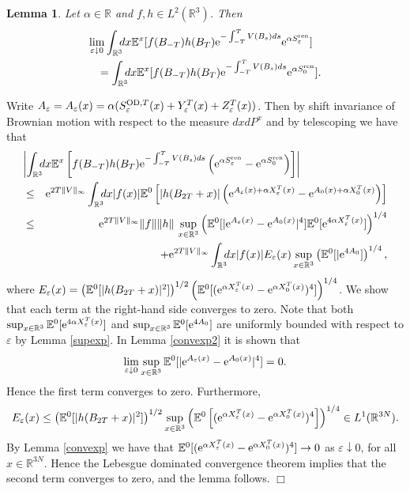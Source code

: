 \documentclass[11pt]{article}
\newtheorem{lemma}[theorem]{Lemma}
\providecommand{\idx}{\int_{\BR} \!\!\! dx}
\newcommand{\Ebb}{{\mathbb E}}
\providecommand{\qed}{\hfill {$\Box$}\par\medskip}
\providecommand{\BR}{{\mathbb{R}^3 }}
\providecommand{\od}{{\rm OD}}
\providecommand{\RR}{\mathbb{R}}
\providecommand{\LR}{{L^2(\BR)}}
\providecommand{\lk}{\left(}
\providecommand{\rk}{\right)}
\providecommand{\han}{{1/2}}
\providecommand{\non}{\nonumber}
\providecommand{\e}{{\rm e}}
\providecommand{\1}{\mathbb{1}}
\providecommand{\eps}{\varepsilon}
\providecommand{\ren}{{\rm ren}}
\begin{document}
\begin{lemma}
\label{54321}
Let $\alpha\in\RR$ and  $f,h\in\LR$. Then
\begin{eqnarray}
\lefteqn{
\lim_{\eps\downarrow 0}\idx  \Ebb^x [f(B_{-T}) h(B_T)  \e^{-\int_{-T}^TV(B_s)ds}
\e^{\alpha S_\eps^\ren }]\non} \\
&&\label{hanatarasi}
= \idx  \Ebb^x [f(B_{-T} )h(B_T)\e^{-\int_{-T}^TV(B_s)ds}\e^{\alpha S_0^\ren }].
\end{eqnarray}
\end{lemma}
\proof
Write ${A_\eps}=A_\eps(x)=\alpha(S^{\od,T}_\eps(x)+Y_\eps^T(x)+Z_\eps^T(x))$. Then by shift
invariance of Brownian motion with respect to the measure $dx dP^x$ and 
by telescoping we have
that
\begin{eqnarray*}
\lefteqn{
\left|\idx  \Ebb^x \left[f(B_{-T}) h(B_T) \e^{-\int_{-T}^TV(B_s)ds}
\lk \e^{\alpha S_\eps^\ren } - \e^{\alpha S_0^\ren }\rk \right]\right| } \\
&\leq&
\e^{2T\|V\|_\infty}\idx |f(x)|\Ebb^0 \left[ |h(B_{2T}+x)|
\lk \e^{A_\eps(x)+\alpha X_\eps^T(x)} - \e^{A_0(x)+\alpha X_0^T(x)}\rk \right]\\
&\leq&
\e^{2T\|V\|_\infty} \|f\| \|h\| \, \sup_{x\in\BR}\lk \Ebb^0[|\e^{A_\eps(x)}-\e^{A_0(x)}|^4]
\Ebb^0[\e^{4\alpha X_\eps^T(x)}]\rk^{1/4}\\
&&\qquad +
\e^{2T\|V\|_\infty} 
\idx   |f(x)| E_\eps(x)   
\sup_{x\in\BR} \lk \Ebb ^0[|\e^{4  A_0}]\rk^{1/4},
\end{eqnarray*}
where $E_\eps(x)= \lk \Ebb^0[|h(B_{2T}+x)|^2] \rk ^\han \lk \Ebb^0[ (\e^{\alpha X_\eps^T(x)}-
\e^{\alpha X_0^T(x)})^4]\rk ^{1/4}$. 
We show that each term at the right-hand side converges to
zero. 
Note that both $\sup_{x\in\BR} \Ebb^0[\e^{4\alpha X_\eps^T(x)}]$ and $\sup_{x\in\BR}
\Ebb^0[\e^{4 A_0}]$ are uniformly bounded with respect to $\eps$ by Lemma \ref{supexp}.
In Lemma \ref{convexp2}  it is shown that
$$
\lim_{\eps\downarrow 0} \sup_{x\in\BR}  \Ebb^0[|\e^{A_\eps(x)}-\e^{A_0(x)}|^4]= 0.
$$
Hence the first term converges to zero. Furthermore,
\begin{align*}
E_\eps(x) \leq  \lk \Ebb^0[|h(B_{2T}+x)|^2] \rk^\han \sup_{x\in\BR}\lk 
\Ebb^0\left[ (\e^{\alpha X_\eps^T(x)}-\e^{\alpha X_0^T(x)})^4\right] \rk ^{1/4} \in L^1(\RR^{3N}).
\end{align*}
By Lemma \ref{convexp} we have that $\Ebb^0[(\e^{\alpha X_\eps^T(x)}-\e^{\alpha X_0^T(x)})^4]\to 0$
as $\eps\downarrow 0$, for all $x\in\RR^{3N}$. Hence the Lebesgue dominated convergence theorem
implies that the second term converges to zero, and the lemma follows.
\qed
\end{document}
